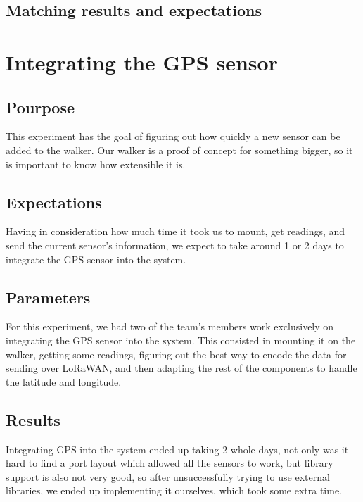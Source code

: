 	\subsection{Matching results and expectations}











\section{Integrating the GPS sensor}
	\subsection{Pourpose}
	This experiment has the goal of figuring out how quickly a new sensor can be added to the walker. Our walker is a proof of concept for something bigger, so it is important to know how extensible it is.

	\subsection{Expectations}
	Having in consideration how much time it took us to mount, get readings, and send the current sensor's information, we expect to take around 1 or 2 days to integrate the GPS sensor into the system. 

	\subsection{Parameters}
	For this experiment, we had two of the team's members work exclusively on integrating the GPS sensor into the system. This consisted in mounting it on the walker, getting some readings, figuring out the best way to encode the data for sending over LoRaWAN, and then adapting the rest of the components to handle the latitude and longitude.

	\subsection{Results}
	Integrating GPS into the system ended up taking 2 whole days, not only was it hard to find a port layout which allowed all the sensors to work, but library support is also not very good, so after unsuccessfully trying to use external libraries, we ended up implementing it ourselves, which took some extra time.

